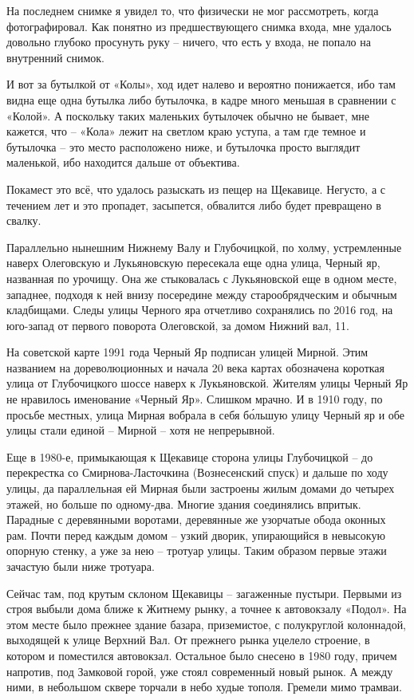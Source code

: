 \newpage

На последнем снимке я увидел то, что физически не мог рассмотреть, когда фотографировал. Как понятно из предшествующего снимка входа, мне удалось довольно глубоко просунуть руку – ничего, что есть у входа, не попало на внутренний снимок. 

И вот за бутылкой от «Колы», ход идет налево и вероятно понижается, ибо там видна еще одна бутылка либо бутылочка, в кадре много меньшая в сравнении с «Колой». А поскольку таких маленьких бутылочек обычно не бывает, мне кажется, что – «Кола» лежит на светлом краю уступа, а там где темное и бутылочка – это место расположено ниже, и бутылочка просто выглядит маленькой, ибо находится дальше от объектива.

Покамест это всё, что удалось разыскать из пещер на Щекавице. Негусто, а с течением лет и это пропадет, засыпется, обвалится либо будет превращено в свалку. 

Параллельно нынешним Нижнему Валу и Глубочицкой, по холму, устремленные наверх Олеговскую и Лукьяновскую пересекала еще одна улица, Черный яр, названная по урочищу. Она же стыковалась с Лукьяновской еще в одном месте, западнее, подходя к ней внизу посередине между старообрядческим и обычным кладбищами. Следы улицы Черного яра отчетливо сохранялись по 2016 год, на юго-запад от первого поворота Олеговской, за домом Нижний вал, 11. 

На советской карте 1991 года Черный Яр подписан улицей Мирной. Этим названием на дореволюционных и начала 20 века картах обозначена короткая улица от Глубочицкого шоссе наверх к Лукьяновской. Жителям улицы Черный Яр не нравилось именование «Черный Яр». Слишком мрачно. И в 1910 году, по просьбе местных, улица Мирная вобрала в себя б\'ольшую улицу Черный яр и обе улицы стали единой – Мирной – хотя не непрерывной.

Еще в 1980-е, примыкающая к Щекавице сторона улицы Глубочицкой – до перекрестка со Смирнова-Ласточ\-кина (Вознесенский спуск) и дальше по ходу улицы, да параллельная ей Мирная были застроены жилым домами до четырех этажей, но больше по одному-два. Многие здания соединялись впритык. Парадные с деревянными воротами, деревянные же узорчатые обода оконных рам. Почти перед каждым домом – узкий дворик, упирающийся в невысокую опорную стенку, а уже за нею – тротуар улицы. Таким образом первые этажи зачастую были ниже тротуара.

Сейчас там, под крутым склоном Щекавицы – загаженные пустыри. Первыми из строя выбыли дома ближе к Житнему рынку, а точнее к автовокзалу «Подол». На этом месте было прежнее здание базара, приземистое, с полукруглой колоннадой, выходящей к улице Верхний Вал. От прежнего рынка уцелело строение, в котором и поместился автовокзал. Остальное было снесено в 1980 году, причем напротив, под Замковой горой, уже стоял современный новый рынок. А между ними, в небольшом сквере торчали в небо худые тополя. Гремели мимо трамваи.


